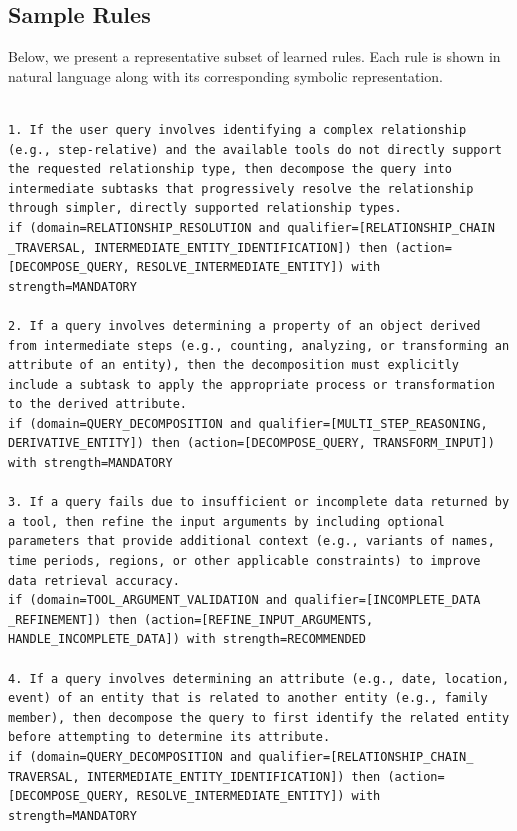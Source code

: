 
\subsection{Sample Rules}
\label{app:sample_rules}

Below, we present a representative subset of learned rules. Each rule is shown in natural language along with its corresponding symbolic representation.

\lstset{inputencoding=utf8}


\begin{lstlisting}[style=rulestyle, caption={Sample rules learned from the ToolHop dataset}]

1. If the user query involves identifying a complex relationship (e.g., step-relative) and the available tools do not directly support the requested relationship type, then decompose the query into intermediate subtasks that progressively resolve the relationship through simpler, directly supported relationship types.
if (domain=RELATIONSHIP_RESOLUTION and qualifier=[RELATIONSHIP_CHAIN
_TRAVERSAL, INTERMEDIATE_ENTITY_IDENTIFICATION]) then (action=[DECOMPOSE_QUERY, RESOLVE_INTERMEDIATE_ENTITY]) with strength=MANDATORY

2. If a query involves determining a property of an object derived from intermediate steps (e.g., counting, analyzing, or transforming an attribute of an entity), then the decomposition must explicitly include a subtask to apply the appropriate process or transformation to the derived attribute.
if (domain=QUERY_DECOMPOSITION and qualifier=[MULTI_STEP_REASONING, DERIVATIVE_ENTITY]) then (action=[DECOMPOSE_QUERY, TRANSFORM_INPUT]) with strength=MANDATORY

3. If a query fails due to insufficient or incomplete data returned by a tool, then refine the input arguments by including optional parameters that provide additional context (e.g., variants of names, time periods, regions, or other applicable constraints) to improve data retrieval accuracy.
if (domain=TOOL_ARGUMENT_VALIDATION and qualifier=[INCOMPLETE_DATA
_REFINEMENT]) then (action=[REFINE_INPUT_ARGUMENTS, HANDLE_INCOMPLETE_DATA]) with strength=RECOMMENDED

4. If a query involves determining an attribute (e.g., date, location, event) of an entity that is related to another entity (e.g., family member), then decompose the query to first identify the related entity before attempting to determine its attribute.
if (domain=QUERY_DECOMPOSITION and qualifier=[RELATIONSHIP_CHAIN_
TRAVERSAL, INTERMEDIATE_ENTITY_IDENTIFICATION]) then (action=[DECOMPOSE_QUERY, RESOLVE_INTERMEDIATE_ENTITY]) with strength=MANDATORY


\end{lstlisting}
